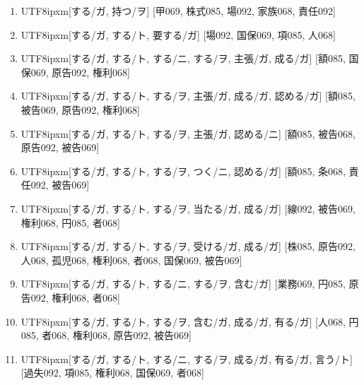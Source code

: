 \begin{enumerate}
\item \begin{CJK}{UTF8}{ipxm}[する/ガ, 持つ/ヲ] [甲069, 株式085, 場092, 家族068, 責任092]\end{CJK}
\item \begin{CJK}{UTF8}{ipxm}[する/ガ, する/ト, 要する/ガ] [場092, 国保069, 項085, 人068]\end{CJK}
\item \begin{CJK}{UTF8}{ipxm}[する/ガ, する/ト, する/ニ, する/ヲ, 主張/ガ, 成る/ガ] [額085, 国保069, 原告092, 権利068]\end{CJK}
\item \begin{CJK}{UTF8}{ipxm}[する/ガ, する/ト, する/ヲ, 主張/ガ, 成る/ガ, 認める/ガ] [額085, 被告069, 原告092, 権利068]\end{CJK}
\item \begin{CJK}{UTF8}{ipxm}[する/ガ, する/ト, する/ヲ, 主張/ガ, 認める/ニ] [額085, 被告068, 原告092, 被告069]\end{CJK}
\item \begin{CJK}{UTF8}{ipxm}[する/ガ, する/ト, する/ヲ, つく/ニ, 認める/ガ] [額085, 条068, 責任092, 被告069]\end{CJK}
\item \begin{CJK}{UTF8}{ipxm}[する/ガ, する/ト, する/ヲ, 当たる/ガ, 成る/ガ] [線092, 被告069, 権利068, 円085, 者068]\end{CJK}
\item \begin{CJK}{UTF8}{ipxm}[する/ガ, する/ト, する/ヲ, 受ける/ガ, 成る/ガ] [株085, 原告092, 人068, 孤児068, 権利068, 者068, 国保069, 被告069]\end{CJK}
\item \begin{CJK}{UTF8}{ipxm}[する/ガ, する/ト, する/ニ, する/ヲ, 含む/ガ] [業務069, 円085, 原告092, 権利068, 者068]\end{CJK}
\item \begin{CJK}{UTF8}{ipxm}[する/ガ, する/ト, する/ヲ, 含む/ガ, 成る/ガ, 有る/ガ] [人068, 円085, 者068, 権利068, 原告092, 被告069]\end{CJK}
\item \begin{CJK}{UTF8}{ipxm}[する/ガ, する/ト, する/ニ, する/ヲ, 成る/ガ, 有る/ガ, 言う/ト] [過失092, 項085, 権利068, 国保069, 者068]\end{CJK}

\end{enumerate}
